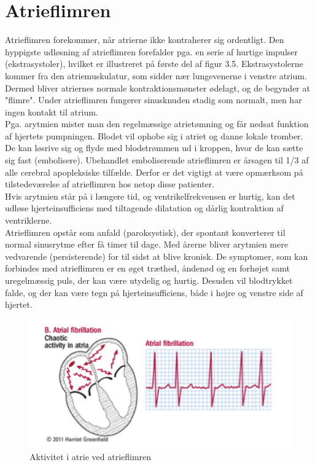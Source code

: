 \section{Atrieflimren}
Atrieflimren forekommer, når atrierne ikke kontraherer sig ordentligt. Den hyppigste udløsning af atrieflimren forefalder pga. en serie af hurtige impulser (ekstrasystoler), hvilket er illustreret på første del af figur 3.5.  Ekstrasystolerne kommer fra den atriemuskulatur, som sidder nær lungevenerne i venstre atrium. Dermed bliver atriernes normale kontraktionsmønster ødelagt, og de begynder at "flimre". Under atrieflimren fungerer sinusknuden stadig som normalt, men har ingen kontakt til atrium.\\
Pga. arytmien mister man den regelmæssige atrietømning og får nedsat funktion af hjertets pumpningen. Blodet vil ophobe sig i atriet og danne lokale tromber.  De kan løsrive sig og flyde med blodstrømmen ud i kroppen, hvor de kan sætte sig fast (embolisere). Ubehandlet emboliserende atrieflimren er årsagen til 1/3 af alle cerebral apopleksiske tilfælde. Derfor er det vigtigt at være opmærksom på tilstedeværelse af atrieflimren hos netop disse patienter.\\
Hvis arytmien står på i længere tid, og ventrikelfrekvensen er hurtig, kan det udløse hjerteinsufficiens med tiltagende dilatation og dårlig kontraktion af ventriklerne. \\
Atrieflimren opstår som anfald (paroksystisk), der spontant konverterer til normal sinusrytme efter få timer til dage. Med årerne bliver arytmien mere vedvarende (persisterende) for til sidst at blive kronisk.  De symptomer, som kan forbindes med atrieflimren er en øget træthed, åndenød og en forhøjet samt uregelmæssig puls, der kan være utydelig og hurtig. Desuden vil blodtrykket falde, og der kan være tegn på hjerteinsufficiens, både i højre og venstre side af hjertet. 

\begin{figure}[htb]
	\centering
	\includegraphics[width=1\textwidth]{Figurer/Snip20150412_32}
	\caption{Aktivitet i atrie ved atrieflimren\protect\footnotemark}
\end{figure}

